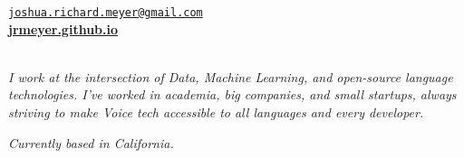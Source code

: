 \documentclass{resume} %
\begin{document}
\vspace{-.25cm}
\begin{center}
\href{mailto:joshua.richard.meyer@gmail.com}{\nolinkurl{joshua.richard.meyer@gmail.com}}\\
\vspace{.15cm}
\href{https://jrmeyer.github.io}{\textbf{jrmeyer.github.io}} \\
\vspace{.15cm}
\href{https://github.com/JRMeyer}{\faGithub} \hspace{.25cm} \href{https://www.linkedin.com/in/josh-r-meyer/}{\faLinkedin} \\

\vspace{.5cm}

\textit{I work at the intersection of Data, Machine Learning, and open-source language technologies. I've worked in academia, big companies, and small startups, always striving to make Voice tech accessible to all languages and every developer.}

\vspace{.5cm}

\textit{Currently based in California.}
\end{center}
\end{document}
